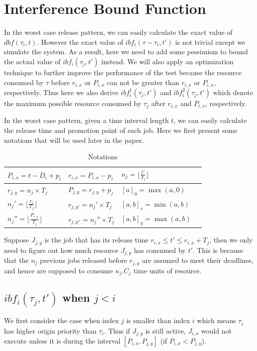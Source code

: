 \section{Interference Bound Function}
In the worst case release pattern, we can easily calculate the exact value of $dbf(\tau_i,t)$. However the exact value of $ibf_i(\tau-\tau_i,t')$ is not trivial except we simulate the system.  As a result, here we need to add some pessimism to bound the actual value of  $ibf_i(\tau_j,t')$ instead. We will also apply an optimization technique to further improve the performance of the test because the resource consumed by $\tau$ before $r_{i,x}$ or $P_{i,x}$ can not be greater than $r_{i,x}$ or $P_{i,x}$, respectively. Thus here we also derive  $ibf_i^1(\tau_j,t')$ and $ibf_i^2(\tau_j,t')$ which denote the maximum possible resource consumed by  $\tau_j$ after $r_{i,x}$ and $P_{i,x}$, respectively.  



In the worst case pattern, given a time interval length $t$, we can easily calculate the release time and promotion point of each job.
Here we first present some notations that  will be used later in the paper.
\begin{table}[h]
\caption{Notations}
\label{tab:x}
\center
\begin{tabular}{|l|l|l|l|}
 \hline
 $P_{i,x}=t-D_i+p_i$ & $r_{i,x}=P_{i,x}-p_i$ & $n_j=\lfloor \frac{t'}{T_j}\rfloor$ \\
 \hline
 $r_{j,y}=n_j\times T_j$ &$P_{j,y}=r_{j,y}+p_j$ &$[a]_0=\max(a,0)$\\
 \hline
$n_j'=\lfloor \frac{r_i}{T_j}\rfloor$  & $r_{j,y'}=n_j'\times T_j$& $[a,b]_s=\min(a,b)$\\
 \hline
	$n_j''=\lfloor \frac{P_{i,x}}{T_j}\rfloor$ &  $r_{j,y''}=n_j''\times T_j$&	 $[a,b]_g=\max(a,b)$\\
  \hline
\end{tabular}
\end{table}


Suppose $J_{j,y}$ is the job that has its release time $r_{i,x}\leq t'\leq r_{i,x}+T_j$, then we only need to figure out how much resource  $J_{j,y}$ has consumed by $t'$.  This is because that the $n_j$ previous jobs released before  $r_{j,y}$ are assumed to meet their deadlines, and hence are supposed to consume $n_j.C_j$ time units of resource. 

\subsection{$ibf_i(\tau_j,t')$ when $j<i$}
We first consider the case when index $j$ is smaller than index $i$ which means $\tau_j$ has higher origin priority than $\tau_i$. Thus if  $J_{j,y}$ is still active, $J_{i,x}$ would not  execute unless it is during the interval $[P_{i,x}, P_{j,y}]$ (if $P_{i,x}<P_{j,y}$).


